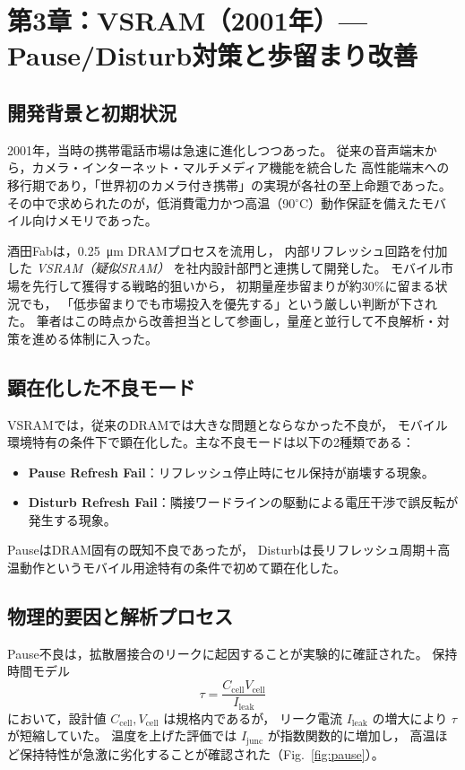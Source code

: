 \documentclass[conference]{IEEEtran}
\let\meter\metre
\begin{document}
\section{第3章：VSRAM（2001年）— Pause/Disturb対策と歩留まり改善}

\subsection{開発背景と初期状況}
2001年，当時の携帯電話市場は急速に進化しつつあった。
従来の音声端末から，カメラ・インターネット・マルチメディア機能を統合した
高性能端末への移行期であり，「世界初のカメラ付き携帯」の実現が各社の至上命題であった。  
その中で求められたのが，低消費電力かつ高温（90$^\circ$C）動作保証を備えたモバイル向けメモリであった。

酒田Fabは，\SI{0.25}{\micro\meter} DRAMプロセスを流用し，
内部リフレッシュ回路を付加した \emph{VSRAM（疑似SRAM）} を社内設計部門と連携して開発した。
モバイル市場を先行して獲得する戦略的狙いから，
初期量産歩留まりが約30\%に留まる状況でも，
「低歩留まりでも市場投入を優先する」という厳しい判断が下された。  
筆者はこの時点から改善担当として参画し，量産と並行して不良解析・対策を進める体制に入った。

\subsection{顕在化した不良モード}
VSRAMでは，従来のDRAMでは大きな問題とならなかった不良が，
モバイル環境特有の条件下で顕在化した。主な不良モードは以下の2種類である：
\begin{itemize}
  \item \textbf{Pause Refresh Fail}：リフレッシュ停止時にセル保持が崩壊する現象。
  \item \textbf{Disturb Refresh Fail}：隣接ワードラインの駆動による電圧干渉で誤反転が発生する現象。
\end{itemize}

PauseはDRAM固有の既知不良であったが，
Disturbは長リフレッシュ周期＋高温動作というモバイル用途特有の条件で初めて顕在化した。

\subsection{物理的要因と解析プロセス}
Pause不良は，拡散層接合のリークに起因することが実験的に確証された。
保持時間モデル
\[
\tau = \frac{C_{\mathrm{cell}} V_{\mathrm{cell}}}{I_{\mathrm{leak}}}
\]
において，設計値 $C_{\mathrm{cell}}, V_{\mathrm{cell}}$ は規格内であるが，
リーク電流 $I_{\mathrm{leak}}$ の増大により $\tau$ が短縮していた。
温度を上げた評価では $I_{\mathrm{junc}}$ が指数関数的に増加し，
高温ほど保持特性が急激に劣化することが確認された（Fig.~\ref{fig:pause}）。
\end{document}
